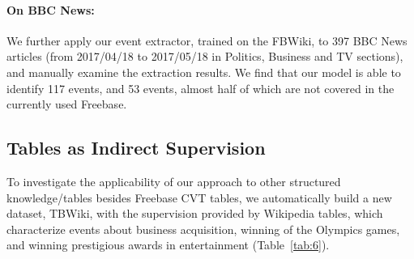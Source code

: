 
\paragraph{On BBC News:}
We further apply our event extractor, trained on the FBWiki, to 397 BBC News
articles (from 2017/04/18 to 2017/05/18 in Politics, Business and TV sections), and manually examine the extraction results. We find that our model is able to identify 117 events, and 53 events,
almost half of which are not covered in the currently used Freebase.



\subsection{Tables as Indirect Supervision}
To investigate the applicability of our approach to other structured knowledge/tables besides Freebase CVT tables, %
we automatically build a new dataset, TBWiki, with the supervision provided by Wikipedia tables, which characterize events about business acquisition, winning of the Olympics games, and winning prestigious awards in entertainment (Table~\ref{tab:6}).

